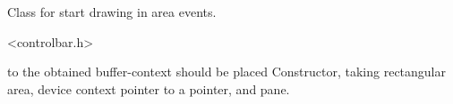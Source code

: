 %
%


\section{}\label{cbstartdrawinareaevent}


Class for start drawing in area events.




<controlbar.h>




\label{cbstartdrawinareaeventcbstartdrawinareaevent}


to the obtained buffer-context should be placed
Constructor, taking rectangular area, device context pointer to a pointer, and pane.

